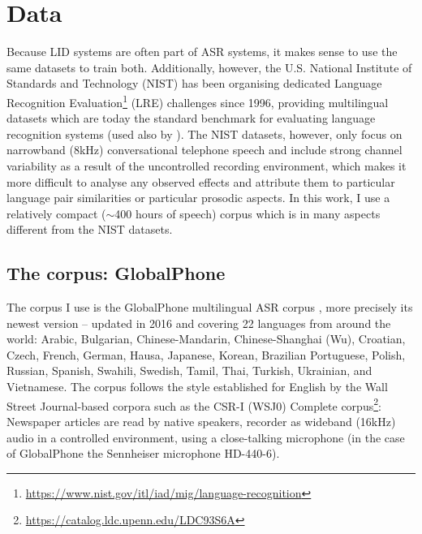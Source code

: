\documentclass[bsc,frontabs,twoside,singlespacing,parskip,deptreport]{infthesis}
\begin{document}
\chapter{Data}{
  \label{chap:Data}
  Because LID systems are often part of ASR systems, it makes sense to use the same datasets to train both.
  Additionally, however, the U.S. National Institute of Standards and Technology (NIST) has been organising dedicated Language Recognition Evaluation\footnote{\url{https://www.nist.gov/itl/iad/mig/language-recognition}} (LRE) challenges since 1996, providing multilingual datasets which are today the standard benchmark for evaluating language recognition systems (used also by \citet{Snyder_et_al_2018}). The NIST datasets, however, only focus on narrowband (8kHz) conversational telephone speech and include strong channel variability as a result of the uncontrolled recording environment, which makes it more difficult to analyse any observed effects and attribute them to particular language pair similarities or particular prosodic aspects.
  In this work, I use a relatively compact ($\sim$400 hours of speech) corpus which is in many aspects different from the NIST datasets.

  \section{The corpus: GlobalPhone}{
    \label{sec:GlobalPhone}    
    The corpus I use is the GlobalPhone multilingual ASR corpus \citep{Schultz_et_al_2013}, more precisely its newest version -- updated in 2016 and covering 22 languages from around the world: Arabic, Bulgarian, Chinese-Mandarin, Chinese-Shanghai (Wu), Croatian, Czech, French, German, Hausa, Japanese, Korean, Brazilian Portuguese, Polish, Russian, Spanish, Swahili, Swedish, Tamil, Thai, Turkish, Ukrainian, and Vietnamese. The corpus follows the style established for English by the Wall Street Journal-based corpora \citep{Paul_Baker_1992} such as the CSR-I (WSJ0) Complete corpus\footnote{\url{https://catalog.ldc.upenn.edu/LDC93S6A}}: Newspaper articles are read by native speakers, recorder as wideband (16kHz) audio in a controlled environment, using a close-talking microphone (in the case of GlobalPhone the Sennheiser microphone HD-440-6).
    
}}
\end{document}
